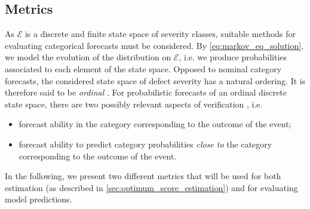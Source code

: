 \subsection{Metrics} \label{sec:error_metrics}
As $\mathcal{E}$ is a discrete and finite state space of severity classes, suitable methods for evaluating categorical forecasts must be considered. By \cref{eq:markov_eq_solution}, we model the evolution of the distribution on $\mathcal{E}$, i.e. we produce probabilities associated to each element of the state space.
Opposed to nominal category forecasts, the considered state space of defect severity has a natural ordering. It is therefore said to be \textit{ordinal} \citep{broecker2008a,hamill1997}.
For probabilistic forecasts of an ordinal discrete state space, there are two possibly relevant aspects of verification \citep{Weijs2010}, i.e. 
\begin{itemize}
\item forecast ability in the category corresponding to the outcome of the event;
\item forecast ability to predict category probabilities \textit{close to} the category corresponding to the outcome of the event.
\end{itemize} 
In the following, we present two different metrics that will be used for both estimation (as described in \cref{sec:optimum_score_estimation}) and for evaluating model predictions.



